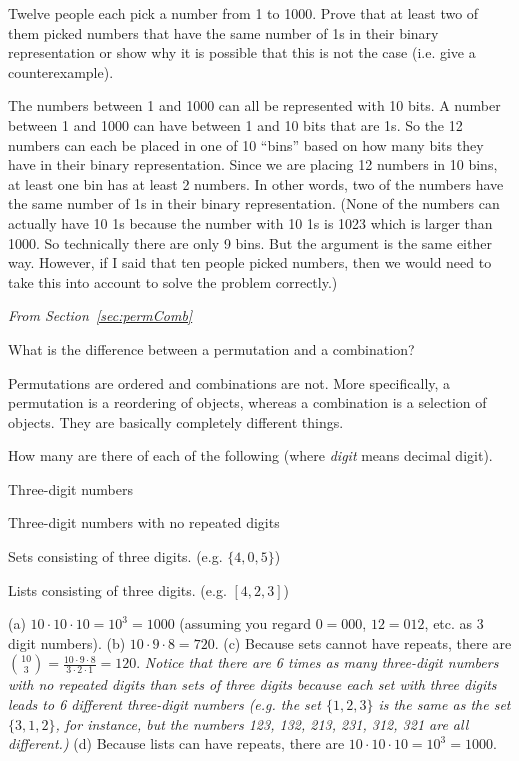 \begin{requ}
Twelve people each pick a number from 1 to 1000. 
Prove that at least two of them picked numbers that have the same number of 1s in their binary representation
or show why it is possible that this is not the case (i.e. give a counterexample).
\begin{requanswer}
The numbers between 1 and 1000 can all be represented with 10 bits. 
A number between 1 and 1000 can have between 1 and 10 bits that are 1s.
So the 12 numbers can each be placed in one of 10 ``bins'' based on how many 
bits they have in their binary representation. Since we are placing 12 numbers in 10 bins,
at least one bin has at least 2 numbers. In other words, two of the numbers have the same number of 1s
in their binary representation.
(None of the numbers can actually have 10 1s because the number with 10 1s is 1023 which is larger than 1000.
So technically there are only 9 bins. But the argument is the same either way.
However, if I said that ten people picked numbers, then we would need to take this into account to solve the problem correctly.)
\end{requanswer}
\end{requ}

\noindent
{\em From Section~\ref{sec:permComb}}

\begin{requ}
What is the difference between a permutation and a combination?
\begin{requanswer}
Permutations are ordered and combinations are not.
More specifically, a permutation is a reordering of objects, 
whereas a combination is a selection of objects. They are basically completely different things.
\end{requanswer}
\end{requ}

\begin{requ}
How many are there of each of the following (where {\em digit} means decimal digit).
\begin{lenum}
\item Three-digit numbers
\item Three-digit numbers with no repeated digits
\item Sets consisting of three digits. (e.g. $\{4, 0, 5\}$)
\item Lists consisting of three digits. (e.g. $[4, 2, 3]$)
\end{lenum}
\begin{requanswer}
(a) $10\cdot 10 \cdot 10 = 10^3=1000$ (assuming you regard $0=000$, $12=012$, etc. as 3 digit numbers).
(b) $10\cdot 9 \cdot 8 = 720$.
(c) Because sets cannot have repeats, there are $\binom{10}{3}=\frac{10\cdot 9 \cdot 8}{3\cdot 2 \cdot 1} = 120$.
{\em Notice that there are 6 times as many three-digit numbers with no repeated digits than sets of three digits because
each set with three digits leads to 6 different three-digit numbers (e.g. the set $\{1, 2, 3\}$ is the same as the set 
$\{3,1,2\}$, for instance, but the numbers 123, 132, 213, 231, 312, 321 are all different.)}
(d) Because lists can have repeats, there are $10\cdot 10\cdot 10=10^3=1000$.
\end{requanswer}
\end{requ}

